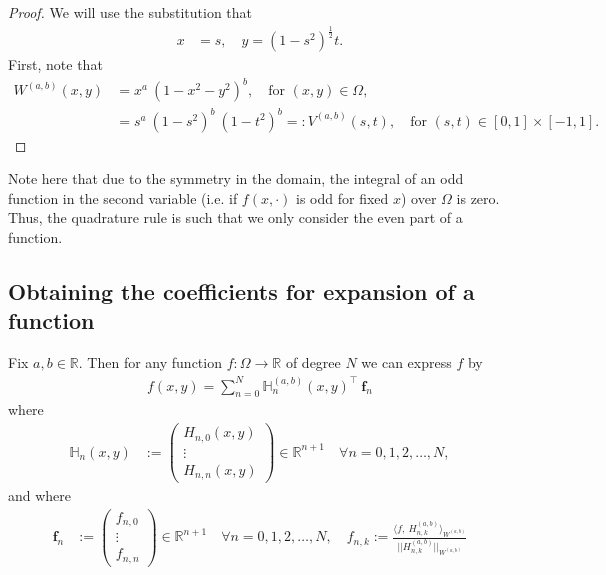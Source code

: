 \documentclass[11pt, oneside]{article}   	%
\newcommand{\sotodoinline}{\todo[color=green,inline=true]}
\newcommand{\half}{\frac{1}{2}}
\newcommand{\R}{\mathbb{R}}
\newcommand{\hdop}{H}
\newcommand{\bighdop}{\mathbb{\hdop}}
\newcommand{\hdopnk}{\hdop_{n,k}}
\begin{document}
\begin{proof}
We will use the substitution that
\begin{align*}
x &= s, \quad y = (1-s^2)^\half t.
\end{align*}
First, note that
\begin{align*}
W^{(a,b)}(x,y) &= x^a \: (1-x^2-y^2)^b, \quad \text{for } (x,y) \in \Omega, \\
		      &= s^a \: (1-s^2)^{b} \: (1-t^2)^b =: V^{(a,b)}(s,t), \quad \text{for } (s,t) \in [0,1] \times [-1,1].
\end{align*}

\sotodoinline{Rest of proof?}
\end{proof}

Note here that due to the symmetry in the domain, the integral of an odd function in the second variable (i.e. if $f(x, \cdot)$ is odd for fixed $x$) over $\Omega$ is zero. Thus, the quadrature rule is such that we only consider the even part of a function.



\subsection{Obtaining the coefficients for expansion of a function}

Fix \(a,b \in \R\). Then for any function \(f : \Omega \to \R\) of degree $N$ we can express \(f\) by
\begin{align*}
f(x,y) = \sum_{n=0}^N \bighdop_n^{(a,b)}(x,y)^\top \: \mathbf{f}_n
\end{align*}
where
\begin{align*}
\bighdop_n(x,y) &:= \begin{pmatrix}
		\hdop_{n,0}(x,y) \\
		\vdots \\
		\hdop_{n,n}(x,y)
	\end{pmatrix} \in \R^{n+1} \quad \forall n = 0,1,2,\dots,N,
\end{align*}
and where
\begin{align*}
\mathbf{f}_n &:= \begin{pmatrix}
		f_{n,0} \\
		\vdots \\
		f_{n,n}
	\end{pmatrix} \in \R^{n+1} \quad \forall n = 0,1,2,\dots,N, \quad
f_{n,k} := \frac{\langle f, \: \hdopnk^{(a,b)} \rangle_{W^{(a,b)}}}{|| \hdopnk^{(a,b)} ||_{W^{(a,b)}}}
\end{align*}
\end{document}
